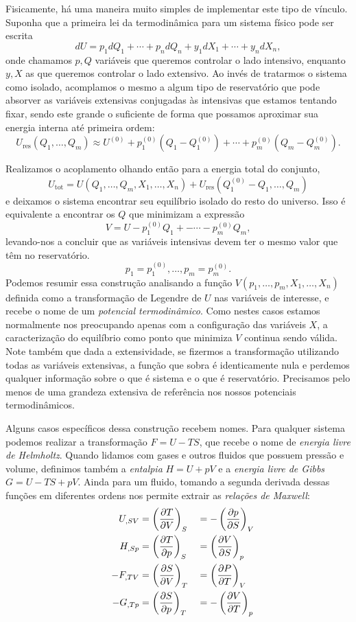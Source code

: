 \documentclass[a4paper, 12pt]{article}
\newcommand{\pd}[3]{
    \ifblank{#3}{}{\left(}
    \frac{\partial #1}{\partial #2}
    \ifblank{#3}{}{\right)_{#3}}
}
\theoremstyle{definition}
\theoremstyle{definition}
\begin{document}
Fisicamente, há uma maneira muito simples de implementar este tipo de vínculo. Suponha que a primeira
lei da termodinâmica para um sistema físico pode ser escrita
$$dU=p_1dQ_1+\cdots+p_ndQ_n+y_1dX_1+\cdots+y_ndX_n,$$
onde chamamos $p,Q$ variáveis que queremos controlar o lado intensivo, enquanto $y,X$ as que queremos
controlar o lado extensivo. Ao invés de tratarmos o sistema como isolado, acomplamos o mesmo a algum
tipo de reservatório que pode absorver as variáveis extensivas conjugadas às intensivas que estamos 
tentando fixar, sendo este grande o suficiente de forma que possamos aproximar sua energia interna 
até primeira ordem:
$$U_\text{res}(Q_1,\dots,Q_m)\approx U^{(0)}+p^{(0)}_1(Q_1-Q^{(0)}_1)+\cdots+p^{(0)}_m(Q_m-Q^{(0)}_m).$$

Realizamos o acoplamento olhando então para a energia total do conjunto,
$$U_\text{tot}=U(Q_1,\dots,Q_m,X_1,\dots,X_n)+U_\text{res}(Q^{(0)}_1-Q_1,\dots,Q_m)$$
e deixamos o sistema encontrar seu equilíbrio isolado do resto do universo. Isso é equivalente a encontrar
os $Q$ que minimizam a expressão
$$V=U-p^{(0)}_1Q_1+-\cdots-p^{(0)}_mQ_m,$$
levando-nos a concluir que as variáveis intensivas devem ter o mesmo valor que têm no reservatório.
$$p_1=p^{(0)}_1,\dots,p_m=p^{(0)}_m.$$
Podemos resumir essa construção analisando a função $V(p_1,\dots,p_m,X_1,\dots,X_n)$ definida como a
transformação de Legendre de $U$ nas variáveis de interesse, e recebe o nome de um \textit{potencial
termodinâmico}. Como nestes casos estamos normalmente
nos preocupando apenas com a configuração das variáveis $X$, a caracterização do equilíbrio como ponto
que minimiza $V$ continua sendo válida. Note também que dada a extensividade, se fizermos a transformação
utilizando todas as variáveis extensivas, a função que sobra é identicamente nula e perdemos qualquer
informação sobre o que é sistema e o que é reservatório. Precisamos pelo menos de uma grandeza extensiva
de referência nos nossos potenciais termodinâmicos.

Alguns casos específicos dessa construção recebem nomes. Para qualquer sistema podemos realizar
a transformação $F=U-TS$, que recebe o nome de \textit{energia livre de Helmholtz}. Quando lidamos
com gases e outros fluidos que possuem pressão e volume, definimos também a \textit{entalpia} $H=U+pV$
e a \textit{energia livre de Gibbs} $G=U-TS+pV$. Ainda para um fluido, tomando a segunda derivada
dessas funções em diferentes ordens nos permite extrair as \textit{relações de Maxwell}:
\begin{alignat*}{3}
    &&U_{,SV}&=\pd{T}{V}{S}&&=-\pd{p}{S}{V}\\
    &&H_{,Sp}&=\pd{T}{p}{S}&&=\pd{V}{S}{p}\\
    &&-F_{,TV}&=\pd{S}{V}{T}&&=\pd{P}{T}{V}\\
    &&-G_{,Tp}&=\pd{S}{p}{T}&&=-\pd{V}{T}{p}
\end{alignat*}
\end{document}
